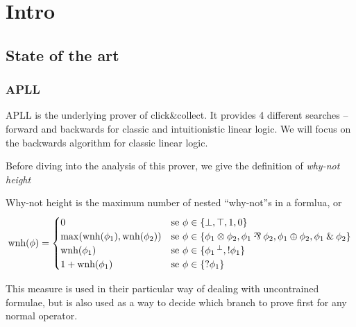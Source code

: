 \documentclass[a4paper, 12pt, tesi, english]{report}
\begin{document}
\tableofcontents

\chapter{Intro}

\section{State of the art}
\subsection{APLL}
APLL is the underlying prover of click\&collect. %
It provides 4 different searches -- forward and backwards for classic and intuitionistic linear logic. 
We will focus on the backwards algorithm for classic linear logic.

Before diving into the analysis of this prover, we give the definition of \textit{why-not height}
\begin{define}
	Why-not height is the maximum number of nested ``why-not''s in a formlua, or
	$$ \text{wnh}(\phi) = 
	\begin{cases}	
		0 & \text{se }\phi \in \{\llbot, \lltop, \llone, \llzero\} \\
		\max(\text{wnh}(\phi_1), \text{wnh}(\phi_2)) & \text{se } \phi \in \{ \phi_1 \llten \phi_2, \phi_1 \llpar \phi_2, \phi_1 \llplus \phi_2, \phi_1 \llwith \phi_2 \} \\
		\text{wnh}(\phi_1) & \text{se }\phi \in \{ \llnot{\phi_1}, \llbang{\phi_1}\} \\
		1 + \text{wnh}(\phi_1) & \text{se }\phi \in \{ \llwn{\phi_1} \} 
	\end{cases}
	$$
\end{define}
This measure is used in their particular way of dealing with uncontrained formulae, but is also used as a way to decide which branch to prove first for any normal operator.
\end{document}
